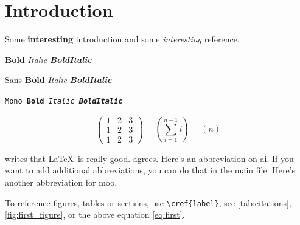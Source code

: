 \chapter{Introduction} \label{chap:introduction}

Some \textbf{interesting} \textsf{introduction} and some \emph{interesting} reference.
\par\textbf{Bold} \textit{Italic} \textbf{\textit{BoldItalic}}
\par\textsf{Sans \textbf{Bold} \textit{Italic} \textbf{\textit{BoldItalic}}}
\par\texttt{Mono \textbf{Bold} \textit{Italic} \textbf{\textit{BoldItalic}}}

\begin{equation}
    \begin{pmatrix}
      1 & 2 & 3  \\
      1 & 2 & 3  \\
      1 & 2 & 3
    \end{pmatrix}
    = \left( \sum_{i=1}^{n-1} i \right)
    = \left( n \right)
\label{eq:first}
\end{equation}

\textcite{Walley2000} writes that \LaTeX\ is really good. \textcite{entrywithurl} agrees. Here's an abbreviation on \gls{ai}. If you want to add additional abbreviations, you can do that in the main file. Here's another abbreviation for \gls{moo}.

To reference figures, tables or sections, use \verb|\cref{label}|, see \cref{tab:citations}, \cref{fig:first_figure}, or the above equation \cref{eq:first}.

